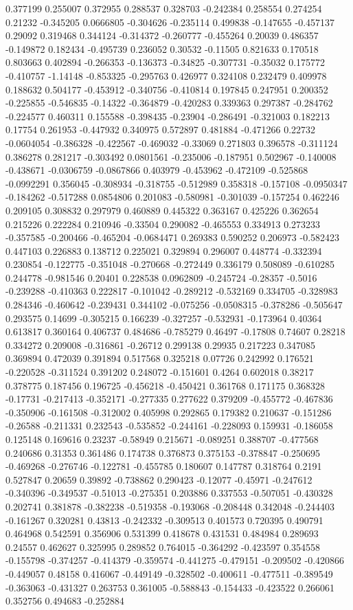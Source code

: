 0.377199 0.255007 0.372955 0.288537 0.328703 -0.242384 0.258554 0.274254 0.21232 -0.345205 0.0666805 -0.304626 -0.235114 0.499838 -0.147655 -0.457137 0.29092 0.319468 0.344124 -0.314372 -0.260777 -0.455264 0.20039 0.486357 -0.149872 0.182434 -0.495739 0.236052 0.30532 -0.11505 0.821633 0.170518 0.803663 0.402894 -0.266353 -0.136373 -0.34825 -0.307731 -0.35032 0.175772 -0.410757 -1.14148 -0.853325 -0.295763 0.426977 0.324108 0.232479 0.409978 0.188632 0.504177 -0.453912 -0.340756 -0.410814 0.197845 0.247951 0.200352 -0.225855 -0.546835 -0.14322 -0.364879 -0.420283 0.339363 0.297387 -0.284762 -0.224577 0.460311 0.155588 -0.398435 -0.23904 -0.286491 -0.321003 0.182213 0.17754 0.261953 -0.447932 0.340975 0.572897 0.481884 -0.471266 0.22732 -0.0604054 -0.386328 -0.422567 -0.469032 -0.33069 0.271803 0.396578 -0.311124 0.386278 0.281217 -0.303492 0.0801561 -0.235006 -0.187951 0.502967 -0.140008 -0.438671 -0.0306759 -0.0867866 0.403979 -0.453962 -0.472109 -0.525868 -0.0992291 0.356045 -0.308934 -0.318755 -0.512989 0.358318 -0.157108 -0.0950347 -0.184262 -0.517288 0.0854806 0.201083 -0.580981 -0.301039 -0.157254 0.462246 0.209105 0.308832 0.297979 0.460889 0.445322 0.363167 0.425226 0.362654 0.215226 0.222284 0.210946 -0.33504 0.290082 -0.465553 0.334913 0.273233 -0.357585 -0.200466 -0.465204 -0.0684471 0.269383 0.590252 0.206973 -0.582423 0.447103 0.226883 0.138712 0.225021 0.329894 0.296007 0.448774 -0.332394 0.230854 -0.122775 -0.351048 -0.270668 -0.272449 0.336179 0.508089 -0.610285 0.244778 -0.981546 0.20401 0.228538 0.0962809 -0.245724 -0.28357 -0.5016 -0.239288 -0.410363 0.222817 -0.101042 -0.289212 -0.532169 0.334705 -0.328983 0.284346 -0.460642 -0.239431 0.344102 -0.075256 -0.0508315 -0.378286 -0.505647 0.293575 0.14699 -0.305215 0.166239 -0.327257 -0.532931 -0.173964 0.40364 0.613817 0.360164 0.406737 0.484686 -0.785279 0.46497 -0.17808 0.74607 0.28218 0.334272 0.209008 -0.316861 -0.26712 0.299138 0.29935 0.217223 0.347085 0.369894 0.472039 0.391894 0.517568 0.325218 0.07726 0.242992 0.176521 -0.220528 -0.311524 0.391202 0.248072 -0.151601 0.4264 0.602018 0.38217 0.378775 0.187456 0.196725 -0.456218 -0.450421 0.361768 0.171175 0.368328 -0.17731 -0.217413 -0.352171 -0.277335 0.277622 0.379209 -0.455772 -0.467836 -0.350906 -0.161508 -0.312002 0.405998 0.292865 0.179382 0.210637 -0.151286 -0.26588 -0.211331 0.232543 -0.535852 -0.244161 -0.228093 0.159931 -0.186058 0.125148 0.169616 0.23237 -0.58949 0.215671 -0.089251 0.388707 -0.477568 0.240686 0.31353 0.361486 0.174738 0.376873 0.375153 -0.378847 -0.250695 -0.469268 -0.276746 -0.122781 -0.455785 0.180607 0.147787 0.318764 0.2191 0.527847 0.20659 0.39892 -0.738862 0.290423 -0.12077 -0.45971 -0.247612 -0.340396 -0.349537 -0.51013 -0.275351 0.203886 0.337553 -0.507051 -0.430328 0.202741 0.381878 -0.382238 -0.519358 -0.193068 -0.208448 0.342048 -0.244403 -0.161267 0.320281 0.43813 -0.242332 -0.309513 0.401573 0.720395 0.490791 0.464968 0.542591 0.356906 0.531399 0.418678 0.431531 0.484984 0.289693 0.24557 0.462627 0.325995 0.289852 0.764015 -0.364292 -0.423597 0.354558 -0.155798 -0.374257 -0.414379 -0.359574 -0.441275 -0.479151 -0.209502 -0.420866 -0.449057 0.48158 0.416067 -0.449149 -0.328502 -0.400611 -0.477511 -0.389549 -0.363063 -0.431327 0.263753 0.361005 -0.588843 -0.154433 -0.423522 0.266061 0.352756 0.494683 -0.252884 
